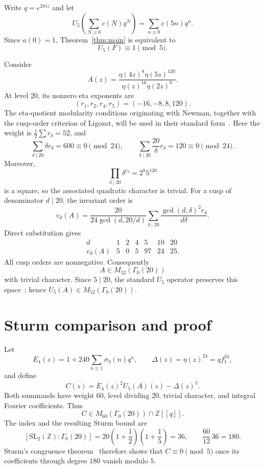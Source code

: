 \documentclass[11pt]{article}
\begin{document}
Write $q=e^{2\pi iz}$ and let
\[
 U_5\!\left(\sum_{N\geq0}c(N)q^N\right)
   =\sum_{n\geq0}c(5n)q^n.
\]
Since $a(0)=1$, Theorem~\ref{thm:main} is equivalent to
\begin{equation}\label{eq:target}
 U_5(F)\equiv1\pmod5.
\end{equation}

Consider
\begin{equation}\label{eq:A}
 A(z)=\frac{\eta(4z)^8\eta(5z)^{120}}
             {\eta(z)^{16}\eta(2z)^8}.
\end{equation}
At level $20$, its nonzero eta exponents are
\[
 (r_1,r_2,r_4,r_5)=(-16,-8,8,120).
\]
The eta-quotient modularity conditions originating with Newman, together
with the cusp-order criterion of Ligozat, will be used in their standard
form~\cite{Newman1959,Ligozat1975}.  Here the weight is
$\frac12\sum r_\delta=52$, and
\[
 \sum_{\delta\mid20}\delta r_\delta=600\equiv0\pmod{24},
 \qquad
 \sum_{\delta\mid20}\frac{20}{\delta}r_\delta
 =120\equiv0\pmod{24}.
\]
Moreover,
\[
 \prod_{\delta\mid20}\delta^{r_\delta}=2^8 5^{120}
\]
is a square, so the associated quadratic character is trivial.  For a
cusp of denominator $d\mid20$, the invariant order is
\begin{equation}\label{eq:cusp-order}
 v_d(A)=\frac{20}{24\gcd(d,20/d)}
 \sum_{\delta\mid20}
 \frac{\gcd(d,\delta)^2r_\delta}{d\delta}.
\end{equation}
Direct substitution gives
\[
\begin{array}{c|rrrrrr}
 d&1&2&4&5&10&20\\ \hline
 v_d(A)&5&0&5&97&24&25.
\end{array}
\]
All cusp orders are nonnegative.  Consequently
\begin{equation}\label{eq:modularity-A}
 A\in M_{52}(\Gamma_0(20))
\end{equation}
with trivial character.  Since $5\mid20$, the standard $U_5$ operator
preserves this space~\cite{AtkinLehner1970}; hence
$U_5(A)\in M_{52}(\Gamma_0(20))$.

\section{Sturm comparison and proof}

Let
\[
 E_4(z)=1+240\sum_{n\geq1}\sigma_3(n)q^n,
 \qquad
 \Delta(z)=\eta(z)^{24}=qf_1^{24},
\]
and define
\begin{equation}\label{eq:C}
 C(z)=E_4(z)^2U_5(A)(z)-\Delta(z)^5.
\end{equation}
Both summands have weight $60$, level dividing $20$, trivial character,
and integral Fourier coefficients.  Thus
\[
 C\in M_{60}(\Gamma_0(20))\cap\mathbb Z[[q]].
\]
The index and the resulting Sturm bound are
\begin{equation}\label{eq:sturm-bound}
 [\mathrm{SL}_2(\mathbb Z):\Gamma_0(20)]
 =20\left(1+\frac12\right)\left(1+\frac15\right)=36,
 \qquad
 \frac{60}{12}\,36=180.
\end{equation}
Sturm's congruence theorem~\cite{Sturm1987} therefore shows that
$C\equiv0\pmod5$ once its coefficients through degree $180$ vanish modulo
$5$.
\end{document}
